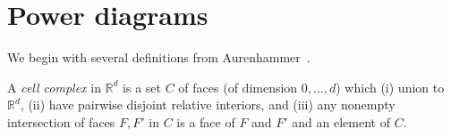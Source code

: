 \documentclass[twoside,11pt]{article}
\newcommand{\reals}{\mathbb{R}}
\newcommand{\E}{\mathbb{E}}
\renewcommand{\H}{\mathcal{H}}
\newcommand{\R}{\mathcal{R}}
\newcommand{\X}{\mathcal{X}}
\newcommand{\Y}{\mathcal{Y}}
\begin{document}
%
%
%


\section{Power diagrams}\label{app:power-diagrams}
We begin with several definitions from Aurenhammer~\cite{aurenhammer1987power}.
\begin{definition}\label{def:cell-complex}
  A \emph{cell complex} in $\reals^d$ is a set $C$ of faces (of dimension $0,\ldots,d$) which (i) union to $\reals^d$, (ii) have pairwise disjoint relative interiors, and (iii) any nonempty intersection of faces $F,F'$ in $C$ is a face of $F$ and $F'$ and an element of $C$.
\end{definition}
\end{document}
